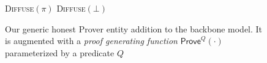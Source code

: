 \begin{figure}[t]
\begin{algorithm}[H]
    \caption{\label{alg.backbone-prover} Our generic honest Prover entity
        addition to the
        backbone model. It is augmented with a{ \em
        proof generating function} $\textsf{Prove}^Q(\cdot)$ parameterized by a
        predicate $Q$}
    \begin{algorithmic}[1]
     \Statex
     \Let\chain\varepsilon
                \State\textsc{Diffuse}{$(\pi)$}
            \Else
                \State\textsc{Diffuse}{$(\bot)$}
            \EndIf
        \EndWhile
        \vskip2pt
    \end{algorithmic}
\end{algorithm}
\end{figure}
